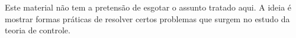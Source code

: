 Este material não tem a pretensão de esgotar o assunto tratado aqui. A ideia é mostrar formas práticas de resolver certos problemas que surgem no estudo da teoria de controle.
